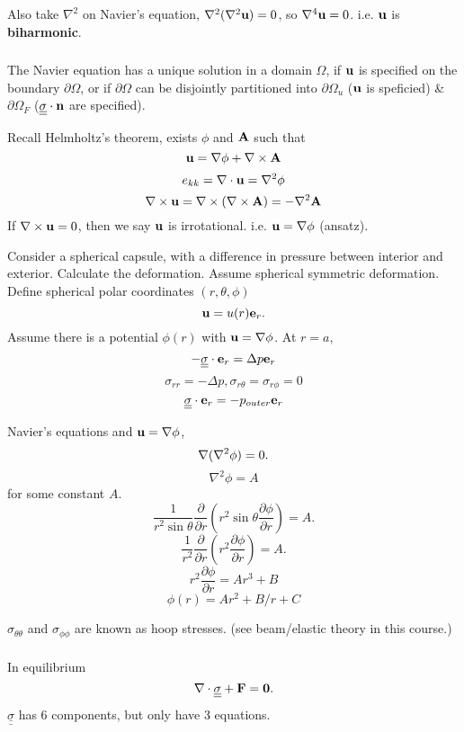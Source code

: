 \documentclass[12pt]{article}
\newcommand{\ee}{{\bf e}}
\newcommand{\nn}{{\bf n}}
\newcommand{\uu}{{\bf u}}
\newcommand{\FF}{{\bf F}}
\newcommand{\bA}{{\bf A}}
\newcommand{\bnabla}{{\bf \nabla}}
\newcommand{\ssigma}{{\underline{\underline \sigma}}}
\begin{document}
Also take $\nabla^2$ on Navier's equation, $\nabla^2(\nabla^2\uu)=0$, so $\nabla^4\uu=0$. i.e. $\uu$ is {\bf biharmonic}. 

\subsubsection{}
The Navier equation has a unique solution in a domain $\Omega$, if $\uu$ is specified on the boundary $\partial\Omega$, or if $\partial \Omega$ can be disjointly partitioned into $\partial\Omega_u$ ($\uu$ is speficied) \& $\partial \Omega_F$ ($\ssigma\cdot\nn$ are specified).

Recall Helmholtz's theorem, exists $\phi$ and $\bA$ such that
\[
\uu = \bnabla\phi + \bnabla\times\bA
\]
\[
e_{kk} = \nabla\cdot\uu = \nabla^2\phi
\]
\[
\nabla\times\uu =  \bnabla\times(\bnabla\times\bA) = -\nabla^2\bA
\]
If $\nabla\times\uu=0$, then we say $\uu$ is irrotational. i.e. $\uu = \bnabla\phi$ (ansatz).

Consider a spherical capsule, with a difference in pressure between interior and exterior. Calculate the deformation. Assume spherical symmetric deformation. Define spherical polar coordinates $(r, \theta, \phi)$
\[
\uu = u(r)\ee_r.
\]
Assume there is a potential $\phi(r)$ with $\uu = \nabla\phi$.
At $r = a$, 
\[
-\ssigma\cdot\ee_r = \Delta p \ee_r
\]
\[
\sigma_{rr} = -\Delta p , \sigma_{r\theta} =\sigma_{r\phi}= 0
\]
\[
\ssigma\cdot\ee_r =  -  p_{outer} \ee_r
\]

Navier's equations and $\uu = \nabla\phi$,
\[
\bnabla(\nabla^2\phi)=0.
\]
\[
\nabla^2\phi= A
\]
for some constant $A$.
\[
\frac{1}{r^2\sin\theta}\frac{\partial}{\partial r}(r^2\sin\theta\frac{\partial\phi}{\partial r})= A.
\]
\[
\frac{1}{r^2}\frac{\partial}{\partial r}(r^2\frac{\partial\phi}{\partial r})= A.
\]
\[
r^2\frac{\partial\phi}{\partial r} = Ar^3 + B
\]
\[
\phi(r) = Ar^2 + B/r + C
\]



$\sigma_{\theta\theta}$ and $\sigma_{\phi\phi}$ are known as hoop stresses. (see beam/elastic theory in this course.)

\subsubsection{}
In equilibrium
\[
\bnabla\cdot\ssigma + \FF = {\bf 0}.
\]
$\ssigma$ has 6 components, but  only have 3 equations.
\end{document}
